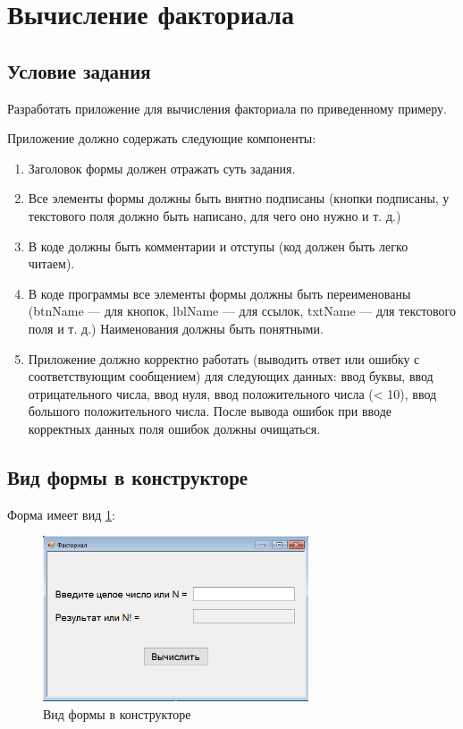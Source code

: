 \section{Вычисление факториала}

\subsection{Условие задания}


Разработать приложение для вычисления факториала по приведенному примеру.

Приложение должно содержать следующие компоненты:

\begin{enumerate}
    \item{Заголовок формы должен отражать суть задания.}
    \item{Все элементы формы должны быть внятно подписаны (кнопки подписаны, у текстового поля должно быть написано, для чего оно нужно и т. д.)}
    \item{В коде должны быть комментарии и отступы (код должен быть легко читаем).}
    \item{В коде программы все элементы формы должны быть переименованы (btnName --- для кнопок, lblName --- для ссылок, txtName --- для текстового поля и т. д.) Наименования должны быть понятными.}
    \item{Приложение должно корректно работать (выводить ответ или ошибку с соответствующим сообщением) для следующих данных: ввод буквы, ввод отрицательного числа, ввод нуля, ввод положительного числа (< 10), ввод большого положительного числа. После вывода ошибок при вводе корректных данных поля ошибок должны очищаться.}
\end{enumerate}

\subsection{Вид формы в конструкторе}

Форма имеет вид \ref{fig:FormInConstruct1}:

\begin{figure}[!h]
    \centering
    \includegraphics[width = 0.7\textwidth]{images/Task1/FormInConstructor.png}
    \caption{Вид формы в конструкторе}
    \label{fig:FormInConstruct1}
\end{figure}

